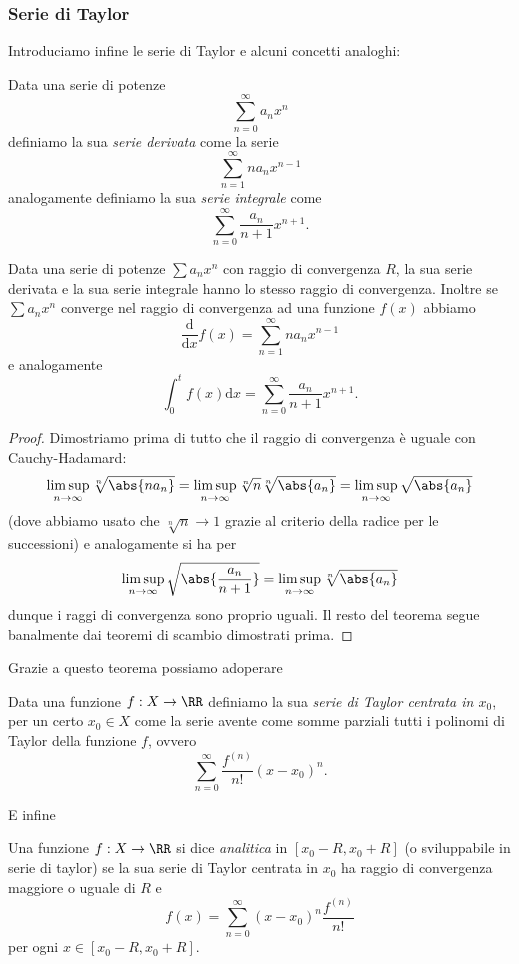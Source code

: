 \documentclass[11pt]{scrartcl}
\newcommand{\dif}{\text{d}}
\begin{document}
	\subsubsection{Serie di Taylor}
	Introduciamo infine le serie di Taylor e alcuni concetti analoghi:
	\begin{definition}
		Data una serie di potenze 
		$$\sum_{n=0}^{\infty}a_nx^n$$
		definiamo la sua \textit{serie derivata} come la serie
		$$\sum_{n=1}^{\infty}na_nx^{n-1}$$
		analogamente definiamo la sua \textit{serie integrale} come
		$$\sum_{n=0}^{\infty}\frac{a_n}{n+1}x^{n+1}.$$
	\end{definition}
	\begin{theorem}
		Data una serie di potenze $\sum a_nx^n$ con raggio di convergenza $R$, la sua serie derivata e la sua serie integrale hanno lo stesso raggio di convergenza. Inoltre se $\sum a_nx^n$ converge nel raggio di convergenza ad una funzione $f(x)$ abbiamo
		$$\frac{\dif}{\dif x}f(x)=\sum_{n=1}^{\infty}na_nx^{n-1}$$
		e analogamente 
		$$\int_0^t f(x)\dif x=\sum_{n=0}^{\infty}\frac{a_n}{n+1}x^{n+1}.$$
	\end{theorem}
	\begin{proof}
		Dimostriamo prima di tutto che il raggio di convergenza è uguale con Cauchy-Hadamard:
		$$\limsup_{n\to\infty}\sqrt[n]{\abs{na_n}}=\limsup_{n\to\infty}\sqrt[n]{n}\sqrt[n]{\abs{a_n}}=\limsup_{n\to\infty}\sqrt{\abs{a_n}}$$
		(dove abbiamo usato che $\sqrt[n]{n}\to 1$ grazie al criterio della radice per le successioni) e analogamente si ha per 
		$$\limsup_{n\to\infty}\sqrt{\abs{\frac{a_n}{n+1}}}=\limsup_{n\to\infty}\sqrt[n]{\abs{a_n}}$$
		dunque i raggi di convergenza sono proprio uguali. Il resto del teorema segue banalmente dai teoremi di scambio dimostrati prima.
	\end{proof}
	Grazie a questo teorema possiamo adoperare
	\begin{definition}
		Data una funzione $f:X\to\RR$ definiamo la sua \textit{serie di Taylor centrata in $x_0$}, per un certo $x_0\in X$ come la serie avente come somme parziali tutti i polinomi di Taylor della funzione $f$, ovvero
		$$\sum_{n=0}^{\infty}\frac{f^{(n)}}{n!}(x-x_0)^n.$$
	\end{definition}
	E infine
	\begin{definition}
		Una funzione $f:X\to\RR$ si dice \textit{analitica} in $[x_0-R,x_0+R]$ (o sviluppabile in serie di taylor) se la sua serie di Taylor centrata in $x_0$ ha raggio di convergenza maggiore o uguale di $R$ e 
		$$f(x)=\sum_{n=0}^{\infty}(x-x_0)^n\frac{f^{(n)}}{n!}$$
		per ogni $x\in [x_0-R,x_0+R]$.
	\end{definition}
\end{document}
